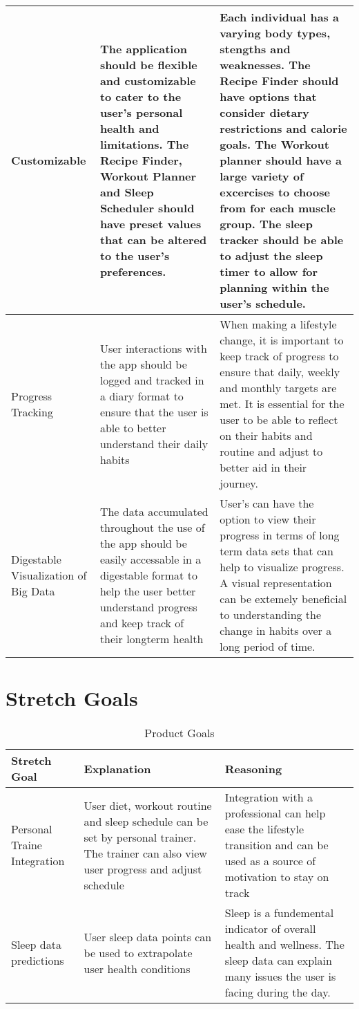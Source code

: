 \documentclass[12pt,letterpaper]{article}
\begin{document}
\begin{longtable}{ |p{3cm}|p{5cm}|p{5cm}| }
 \hline
 Customizable & The application should be flexible and customizable to cater to the user's personal health and limitations. The Recipe Finder, Workout Planner and Sleep Scheduler should have preset values that can be altered to the user's preferences.  & Each individual has a varying body types, stengths and weaknesses. The Recipe Finder should have options that consider dietary restrictions and calorie goals. The Workout planner should have a large variety of excercises to choose from for each muscle group. The sleep tracker should be able to adjust the sleep timer to allow for planning within the user's schedule. \\
 \hline
 Progress Tracking & User interactions with the app should be logged and tracked in a diary format to ensure that the user is able to better understand their daily habits & When making a lifestyle change, it is important to keep track of progress to ensure that daily, weekly and monthly targets are met. It is essential for the user to be able to reflect on their habits and routine and adjust to better aid in their journey.   \\
 \hline
 Digestable Visualization of Big Data & The data accumulated throughout the use of the app should be easily accessable in a digestable format to help the user better understand progress and keep track of their longterm health  & User's can have the option to view their progress in terms of long term data sets that can help to visualize progress. A visual representation can be extemely beneficial to understanding the change in habits over a long period of time.    \\
 \hline
\end{longtable}

\section{Stretch Goals}

\begin{longtable}{ |p{3cm}|p{5cm}|p{5cm}| }
 \caption{Product Goals} \\ 
\toprule 
\textbf{Stretch Goal} &\textbf{ Explanation} & \textbf{Reasoning}\\
 \midrule
 Personal Traine Integration & User diet, workout routine and sleep schedule can be set by personal trainer. The trainer can also view user progress and adjust schedule & Integration with a professional can help ease the lifestyle transition and can be used as a source of motivation to stay on track  \\
 \hline
 Sleep data predictions & User sleep data points can be used to extrapolate user health conditions & Sleep is a fundemental indicator of overall health and wellness. The sleep data can explain many issues the user is facing during the day. \\
 \hline

\end{longtable}
\end{document}
